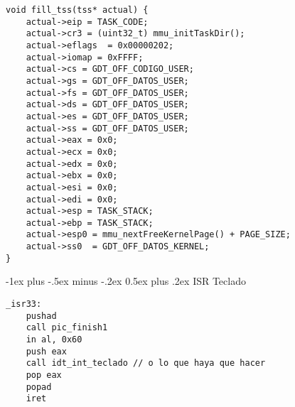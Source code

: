 \documentclass[10pt,landscape]{article}
\makeatletter
\renewcommand{\section}{\@startsection{section}{1}{0mm}%
                                {-1ex plus -.5ex minus -.2ex}%
                                {0.5ex plus .2ex}%
                                {\normalfont\large\bfseries}}
\makeatother
\begin{document}
\begin{multicols*}{3}
\begin{verbatim}
void fill_tss(tss* actual) {
    actual->eip = TASK_CODE;
    actual->cr3 = (uint32_t) mmu_initTaskDir();
    actual->eflags  = 0x00000202;
    actual->iomap = 0xFFFF;
    actual->cs = GDT_OFF_CODIGO_USER;
    actual->gs = GDT_OFF_DATOS_USER;
    actual->fs = GDT_OFF_DATOS_USER;
    actual->ds = GDT_OFF_DATOS_USER;
    actual->es = GDT_OFF_DATOS_USER;
    actual->ss = GDT_OFF_DATOS_USER;
    actual->eax = 0x0;
    actual->ecx = 0x0;
    actual->edx = 0x0;
    actual->ebx = 0x0;
    actual->esi = 0x0;
    actual->edi = 0x0;
    actual->esp = TASK_STACK;
    actual->ebp = TASK_STACK;
    actual->esp0 = mmu_nextFreeKernelPage() + PAGE_SIZE;
    actual->ss0  = GDT_OFF_DATOS_KERNEL;
}
\end{verbatim}


\section{ISR Teclado}%
\label{sec:isrkeyboard}

\begin{verbatim}
_isr33:
    pushad
    call pic_finish1
    in al, 0x60
    push eax
    call idt_int_teclado // o lo que haya que hacer
    pop eax
    popad
    iret
\end{verbatim}


\end{multicols*}
\end{document}
